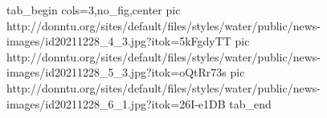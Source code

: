  
 
 
 
 


\ifcmt
  tab_begin cols=3,no_fig,center
     pic http://donntu.org/sites/default/files/styles/water/public/news-images/id20211228_4_3.jpg?itok=5kFgdyTT
		 pic http://donntu.org/sites/default/files/styles/water/public/news-images/id20211228_5_3.jpg?itok=oQtRr73s
		 pic http://donntu.org/sites/default/files/styles/water/public/news-images/id20211228_6_1.jpg?itok=26I-e1DB
  tab_end
\fi


